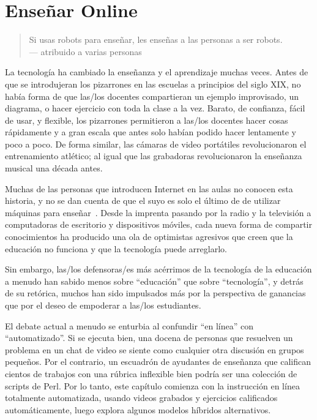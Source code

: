 \chapter{Enseñar Online}\label{s:online}

\begin{quote}

 Si usas robots para enseñar, les enseñas a las personas a ser robots. \\
  --- atribuido a varias personas

\end{quote}

La tecnología ha cambiado la enseñanza y el aprendizaje muchas veces.
Antes de que se introdujeran los pizarrones en las escuelas a principios del siglo XIX,
no había forma de que las/los docentes compartieran un ejemplo improvisado,
un diagrama,
o hacer ejercicio con toda la clase a la vez.
Barato,
de confianza,
fácil de usar,
y flexible,
los pizarrones permitieron a las/los docentes hacer cosas rápidamente y a gran escala
que antes solo habían podido hacer lentamente y poco a poco.
De forma similar,
las cámaras de video portátiles revolucionaron el entrenamiento atlético;
al igual que las grabadoras revolucionaron la enseñanza musical una década antes.

Muchas de las personas que introducen Internet en las aulas no conocen esta historia,
y no se dan cuenta de que el suyo es solo el último de  
de utilizar máquinas para enseñar~\cite{Watt2014}.
Desde la imprenta pasando por la radio y la televisión
a computadoras de escritorio y dispositivos móviles,
cada nueva forma de compartir conocimientos ha producido una ola de optimistas agresivos
que creen que la educación no funciona y que la tecnología puede arreglarlo.

Sin embargo,
las/los defensoras/es más acérrimos de la tecnología de la educación a menudo han sabido menos sobre ``educación'' que sobre ``tecnología'',
y detrás de su retórica,
muchos han sido impulsados más por la perspectiva de ganancias
que por el deseo de empoderar a las/los estudiantes.

El debate actual a menudo se enturbia al confundir ``en línea'' con ``automatizado''.
Si se ejecuta bien,
una docena de personas que resuelven un problema en un chat de video
se siente como cualquier otra discusión en grupos pequeños.
Por el contrario,
un escuadrón de ayudantes de enseñanza que califican cientos de trabajos con una rúbrica inflexible
bien podría ser una colección de scripts de Perl.
Por lo tanto, este capítulo comienza con la instrucción en línea totalmente automatizada,
usando videos grabados y ejercicios calificados automáticamente,
luego explora algunos modelos híbridos alternativos.

